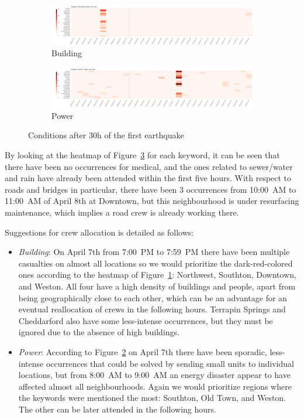 \begin{figure}[!h]
\begin{subfigure}[!h]{0.98\textwidth}
        \centering
        \includegraphics[width=1.00\textwidth]{figs/q1/cond_30h/cond_30h_build.png}
        \caption{Building}
        \label{fig:building_30h}
    \end{subfigure}
    \begin{subfigure}[!h]{0.98\textwidth}
        \centering
        \includegraphics[width=1.00\textwidth]{figs/q1/cond_30h/cond_30h_power.png}
        \caption{Power}
        \label{fig:power_30h}
    \end{subfigure}
    \caption{Conditions after 30h of the first earthquake}
    \label{fig:eq_cond_30h}
\end{figure}

By looking at the heatmap of Figure~\ref{fig:eq_cond_30h} for each keyword, it
can be seen that there have been no occurrences for medical, and the ones
related to sewer/water and rain have already been attended within the first five
hours. With respect to roads and bridges in particular, there have been 3
occurrences from 10:00~AM to 11:00~AM of April 8th at Downtown, but this
neighbourhood is under resurfacing maintenance, which implies a road crew is
already working there.

Suggestions for crew allocation is detailed as follows:

\begin{itemize}
    \item \emph{Building}: On April 7th from 7:00~PM to 7:59~PM there have been
    multiple casualties on almost all locations so we would prioritize the
    dark-red-colored ones according to the heatmap of
    Figure~\ref{fig:building_30h}:
    Northwest, Southton, Downtown, and Weston. All four have a high 
    density of buildings and people, apart from being geographically close to
    each other, which can be an advantage for an eventual reallocation of crews
    in the following hours. Terrapin Springs and Cheddarford also have some
    less-intense occurrences, but they must be ignored due to the absence of
    high buildings.
    \item \emph{Power}: According to Figure~\ref{fig:power_30h} on April 7th 
    there have been sporadic, less-intense
    occurrences that could be solved by sending small units to individual
    locations, but from 8:00~AM to 9:00~AM an energy disaster appear to have
    affected almost all neighbourhoods. Again we would prioritize regions where
    the keywords were mentioned the most: Southton, Old Town, and Weston. The
    other can be later attended in the following hours.
\end{itemize}
